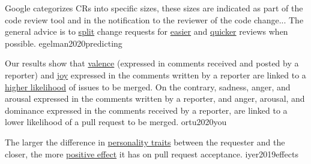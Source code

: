 \documentclass{article}
\begin{document}

  {Google categorizes CRs into specific sizes, these sizes are indicated as part of the code review tool and in the notification to the reviewer of the code change... The general advice is to \ul{split} change requests for \ul{easier} and \ul{quicker} reviews when possible.}
  {egelman2020predicting}


  {Our results show that \ul{valence} (expressed in comments received and posted by a reporter) and \ul{joy} expressed in the comments written by a reporter are linked to a \ul{higher likelihood} of issues to be merged. On the contrary, sadness, anger, and arousal expressed in the comments written by a reporter, and anger, arousal, and dominance expressed in the comments received by a reporter, are linked to a lower likelihood of a pull request to be merged.}
  {ortu2020you}


  {The larger the difference in \ul{personality traits} between the requester and the closer, the more \ul{positive effect} it has on pull request acceptance.}
  {iyer2019effects}
\end{document}
